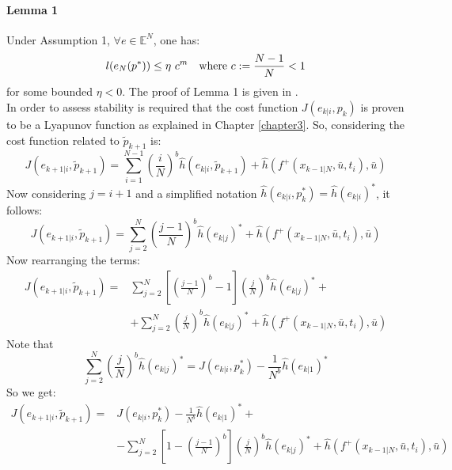 \paragraph{Lemma 1} Under Assumption 1, $\forall e \in \mathbb{E}^N$, one has:
\begin{equation}
	l(e_N(p^*)) \leq \eta\ c^m\ \ \  \textnormal{where    } c:=\frac{N-1}{N} < 1
 	\label{lemma1}
\end{equation}
for some bounded $\eta < 0$. The proof of Lemma 1 is given in \cite{alamir2018stability}. \\

In order to assess stability is required that the cost function $J({e}_{k|i},{p}_k)$ is proven to be a Lyapunov function as explained in Chapter \ref{chapter3}. So, considering the cost function related to $\tilde{p}_{k+1}$ is:
\begin{equation*}
    J({e}_{k+1|i},\tilde{p}_{k+1})=\sum_{i=1}^{N-1}\left(\frac{i}{N}\right)^b \hat{h}({e}_{k|i},\tilde{p}_{k+1})+\hat{h}\left(f^+(x_{k-1|N},\bar{u},t_i),\bar{u}\right)
\end{equation*}
Now considering $j=i+1$ and a simplified notation $\hat{h}({e}_{k|i},p_{k}^*)=\hat{h}(e_{k|i})^*$, it follows: 
\begin{equation*}
    J({e}_{k+1|i},\tilde{p}_{k+1})=\sum_{j=2}^{N}\left(\frac{j-1}{N}\right)^b \hat{h}(e_{k|j})^*+\hat{h}\left(f^+(x_{k-1|N},\bar{u},t_i),\bar{u}\right)
\end{equation*}
Now rearranging the terms: 
\begin{equation*}
    \begin{split}
        J({e}_{k+1|i},\tilde{p}_{k+1})=&\sum_{j=2}^{N}\left[\left(\frac{j-1}{N}\right)^b-1\right]\left(\frac{j}{N}\right)^b \hat{h}(e_{k|j})^*+ \\
        &+\sum_{j=2}^{N}\left(\frac{j}{N}\right)^b \hat{h}(e_{k|j})^* + \hat{h}\left(f^+(x_{k-1|N},\bar{u},t_i),\bar{u}\right)
    \end{split}
\end{equation*}
Note that 
\begin{equation*}
	\sum_{j=2}^{N}\left(\frac{j}{N}\right)^b \hat{h}(e_{k|j})^*=J({e}_{k|i},p_{k}^*)-\frac{1}{N^b}\hat{h}(e_{k|1})^*
\end{equation*}
So we get:
\begin{equation*}
    \begin{split}
        J({e}_{k+1|i},\tilde{p}_{k+1})=&J({e}_{k|i},p_{k}^*)-\frac{1}{N^b}\hat{h}(e_{k|1})^*+ \\ 
        &-\sum_{j=2}^{N}\left[1-\left(\frac{j-1}{N}\right)^b\right]\left(\frac{j}{N}\right)^b \hat{h}(e_{k|j})^*+ \hat{h}\left(f^+(x_{k-1|N},\bar{u},t_i),\bar{u}\right)
    \end{split}
\end{equation*}
